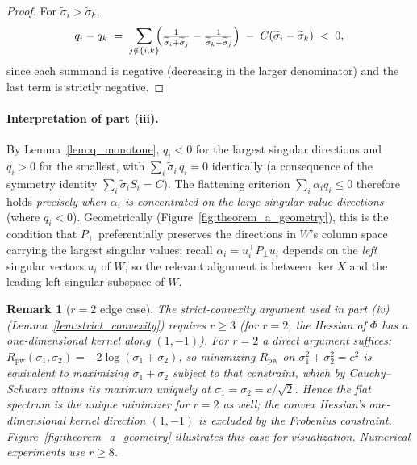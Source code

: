 \documentclass{article}
\newtheorem{remark}{Remark}
\begin{document}
\begin{proof}
For $\widetilde\sigma_i>\widetilde\sigma_k$,
\[
q_i-q_k \;=\; \sum_{j\notin\{i,k\}}\!\!\Bigl(\tfrac{1}{\widetilde\sigma_i+\widetilde\sigma_j}-\tfrac{1}{\widetilde\sigma_k+\widetilde\sigma_j}\Bigr) \;-\; C(\widetilde\sigma_i-\widetilde\sigma_k)
\;<\;0,
\]
since each summand is negative (decreasing in the larger denominator) and the last term is strictly negative.
\end{proof}

\paragraph{Interpretation of part (iii).}
By Lemma~\ref{lem:q_monotone}, $q_i<0$ for the largest singular directions and $q_i>0$ for the smallest, with $\sum_i\widetilde\sigma_i\,q_i=0$ identically (a consequence of the symmetry identity $\sum_i\widetilde\sigma_i S_i = C$). The flattening criterion $\sum_i\alpha_i q_i\leq 0$ therefore holds \emph{precisely when $\alpha_i$ is concentrated on the large-singular-value directions} (where $q_i<0$). Geometrically (Figure~\ref{fig:theorem_a_geometry}), this is the condition that $P_\perp$ preferentially preserves the directions in $W$'s column space carrying the largest singular values; recall $\alpha_i = u_i^\top P_\perp u_i$ depends on the \emph{left} singular vectors $u_i$ of $W$, so the relevant alignment is between $\ker X$ and the leading left-singular subspace of $W$.

\begin{remark}[$r{=}2$ edge case]\label{rem:r2}
The strict-convexity argument used in part (iv) (Lemma~\ref{lem:strict_convexity}) requires $r\geq 3$ (for $r=2$, the Hessian of $\Phi$ has a one-dimensional kernel along $(1,-1)$). For $r=2$ a direct argument suffices: $R_{\mathrm{pw}}(\sigma_1,\sigma_2)=-2\log(\sigma_1+\sigma_2)$, so minimizing $R_{\mathrm{pw}}$ on $\sigma_1^2+\sigma_2^2=c^2$ is equivalent to maximizing $\sigma_1+\sigma_2$ subject to that constraint, which by Cauchy--Schwarz attains its maximum uniquely at $\sigma_1=\sigma_2=c/\sqrt 2$. Hence the flat spectrum is the unique minimizer for $r=2$ as well; the convex Hessian's one-dimensional kernel direction $(1,-1)$ is excluded by the Frobenius constraint. Figure~\ref{fig:theorem_a_geometry} illustrates this case for visualization. Numerical experiments use $r\geq 8$.
\end{remark}
\end{document}
